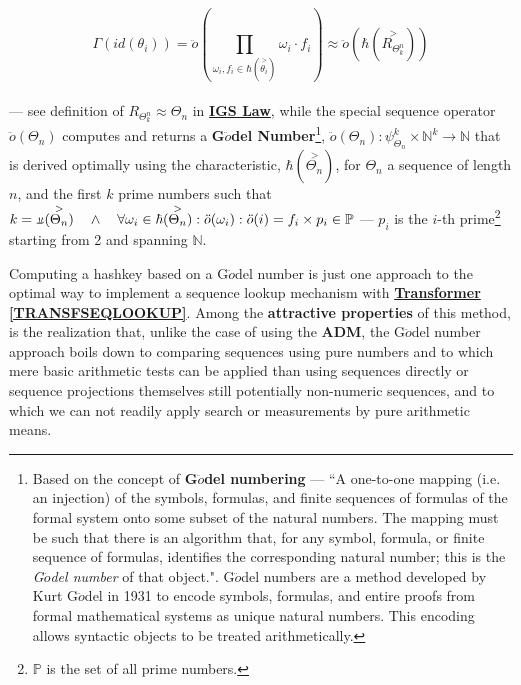 \documentclass[a4paper, 18pt]{book} %
\newcommand{\invpi}{\rotatebox[origin=c]{180}{$\pi$}}
\begin{document}
\begin{equation}
\label{EQHASHKEYSEQ}
 \Gamma (id(\theta_i)) = \ddot{o}(\prod\limits_{\omega_i,f_i \in \hbar(\overset{>}{\theta_i})} \omega_i\cdot f_i) \approx \ddot{o}(\hbar(\overset{>}{R_{\Theta^n_k}}))
\end{equation}\\



 --- see definition of $R_{\Theta^n_k} \approx \Theta_n$ in \textbf{\hyperref[LAWGDL]{IGS Law}}, while the special sequence operator $\ddot{o}(\Theta_n)$ computes and returns a \textbf{G$\ddot{o}$del Number}\cite{illingworth1996computing}\footnote{Based on the concept of \textbf{G$\ddot{o}$del numbering} --- ``A one-to-one mapping (i.e. an injection) of the symbols, formulas, and finite sequences of formulas of the formal system onto some subset of the natural numbers. The mapping must be such that there is an algorithm that, for any symbol, formula, or finite sequence of formulas, identifies the corresponding natural number; this is the \textit{G$\ddot{o}$del number} of that object."\cite{illingworth1996computing}. G$\ddot{o}$del numbers are a method developed by Kurt G$\ddot{o}$del in 1931\cite{godel1931} to encode symbols, formulas, and entire proofs from formal mathematical systems as unique natural numbers. This encoding allows syntactic objects to be treated arithmetically\cite{godel1931english}.}, $\ddot{o}(\Theta_n): \psi_{\Theta_n}^k \times\mathbb{N}^k \rightarrow \mathbb{N}$ that is derived optimally using the characteristic, $\hbar(\overset{>}{\Theta_n})$, for $\Theta_n$ a sequence of length $n$, and the first $k$ prime numbers such that $k = \invpi(\overset{>}{\Theta_n}) \quad \land \quad \forall \omega_i \in \hbar(\overset{>}{\Theta_n}): \ddot{o}(\omega_i) : \ddot{o}(i) = f_i \times p_i \in \mathbb{P}$ --- $p_i$ is the $i$-th prime\footnote{$\mathbb{P}$ is the set of all prime numbers.} starting from 2 and spanning $\mathbb{N}$.
 
 Computing a hashkey based on a G$\ddot{o}$del number is just one approach to the optimal way to implement a sequence lookup mechanism with \textbf{\hyperref[TRANSFSEQLOOKUP]{Transformer \ref{TRANSFSEQLOOKUP}}}. Among the \textbf{attractive properties} of this method, is the realization that, unlike the case of using the \textbf{ADM}, the G$\ddot{o}$del number approach boils down to comparing sequences using pure numbers and to which mere basic arithmetic tests can be applied than using sequences directly or sequence projections themselves still potentially non-numeric sequences, and to which we can not readily apply search or measurements by pure arithmetic means.
 
\end{document}
